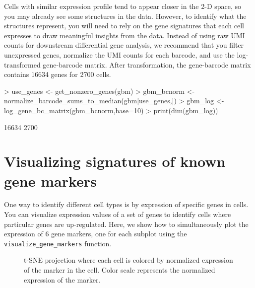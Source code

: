 \documentclass[10pt,oneside]{article}
\begin{document}
Cells with similar expression profile tend to appear closer in the 2-D space, so you may already see some structures in the data. However, to identify what the structures represent, you will need to rely on the gene signatures that each cell expresses to draw meaningful insights from the data. Instead of using raw UMI counts for downstream differential gene analysis, we recommend that you filter unexpressed genes, normalize the UMI counts for each barcode, and use the log-transformed gene-barcode matrix. After transformation, the gene-barcode matrix contains 16634 genes for 2700 cells.
\begin{Schunk}
\begin{Sinput}
> use_genes <- get_nonzero_genes(gbm)
> gbm_bcnorm <- normalize_barcode_sums_to_median(gbm[use_genes,])
> gbm_log <- log_gene_bc_matrix(gbm_bcnorm,base=10)
> print(dim(gbm_log))
\end{Sinput}
\begin{Soutput}
[1] 16634  2700
\end{Soutput}
\end{Schunk}

\vspace{0.5in}
\section{Visualizing signatures of known gene markers}
One way to identify different cell types is by expression of specific genes in cells. You can visualize expression values of a set of genes to identify cells where particular genes are up-regulated. Here, we show how to simultaneously plot the expression of 6 gene markers, one for each subplot using the \verb!visualize_gene_markers! function.

\begin{figure}[htbp]
\begin{center}
\begin{Schunk}
\end{Schunk}
\caption{t-SNE projection where each cell is colored by normalized expression of the marker in the cell. Color scale represents the normalized expression of the marker. }
\label{fig:markers}
\end{center}
\end{figure}
\end{document}
